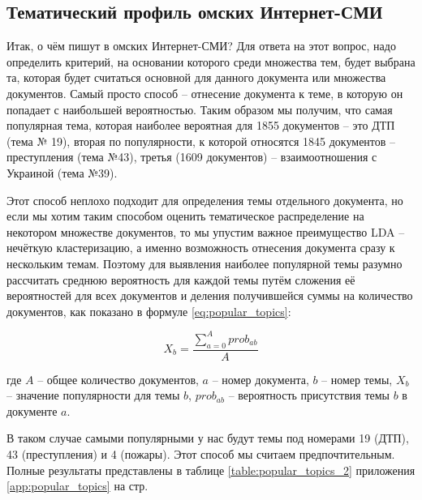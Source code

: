 
\subsection{Тематический профиль омских Интернет-СМИ}
Итак, о чём пишут в омских Интернет-СМИ? Для ответа на этот вопрос, надо определить критерий, на основании которого среди множества тем, будет выбрана та, которая будет считаться основной для данного документа или множества документов. Самый просто способ -- отнесение документа к теме, в которую он попадает с наибольшей вероятностью. Таким образом мы получим, что самая популярная тема, которая наиболее вероятная для 1855 документов -- это ДТП (тема № 19), вторая по популярности, к которой относятся 1845 документов -- преступления (тема №43), третья (1609 документов) -- взаимоотношения с Украиной (тема №39). 

Этот способ неплохо подходит для определения темы отдельного документа, но если мы хотим таким способом оценить тематическое распределение на некотором множестве документов, то мы упустим важное преимущество LDA -- нечёткую кластеризацию, а именно возможность отнесения документа сразу к нескольким темам. Поэтому для выявления наиболее популярной темы разумно рассчитать среднюю вероятность для каждой темы путём сложения её вероятностей для всех документов и деления получившейся суммы на количество документов, как показано в формуле \ref{eq:popular_topics}:

\begin{equation}\label{eq:popular_topics}
X_b = \frac{\sum_{a=0}^{A} prob_{ab}}{A}
\end{equation}

где $A$ -- общее количество документов, $a$ -- номер документа, $b$ -- номер темы, $X_b$ -- значение популярности для темы $b$, $prob_{ab}$ -- вероятность присутствия темы $b$ в документе $a$.

В таком случае самыми популярными у нас будут темы под номерами 19 (ДТП), 43 (преступления) и 4 (пожары). Этот способ мы считаем предпочтительным. Полные результаты представлены в таблице \ref{table:popular_topics_2} приложения \ref{app:popular_topics} на стр. \pageref{table:popular_topics_2}

